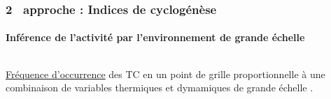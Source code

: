 \documentclass[aspectratio=169, usepdftitle=false, xcolor={dvipsnames}, 9pt,table]{beamer}
\begin{document}
\begin{frame}[t]
    \frametitle{2\ieme~ approche : Indices de cyclogénèse}
    \framesubtitle{Inférence de l'activité par l'environnement de grande échelle}
    \begin{columns}[t]
        \begin{column}{0.5\textwidth}
            \begin{definition}
                \scriptsize
                \underline{Fréquence d'occurrence} des TC en un point de grille proportionnelle à une \mbox{combinaison} de variables \alert{thermiques} et
                \mbox{\alert{dymamiques}} de grande échelle \parencite{gray_tropical_1975}.
            \end{definition}
            \begin{columns}[t]
                \setlength{\leftmargini}{2ex}
                \begin{column}{0.5\textwidth}
                \end{column}
                \begin{column}{0.5\textwidth}
\end{column}
\end{columns}
\end{column}
\end{columns}
\end{frame}
\end{document}
